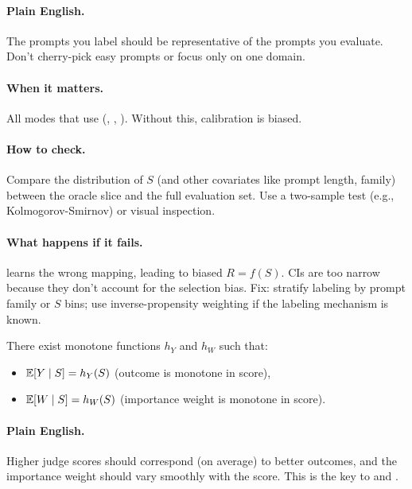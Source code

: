 \paragraph{Plain English.} The prompts you label should be representative of the prompts you evaluate. Don't cherry-pick easy prompts or focus only on one domain.

\paragraph{When it matters.} All modes that use \autocal{} (\dm, \ips, \dr). Without this, calibration is biased.

\paragraph{How to check.} Compare the distribution of $S$ (and other covariates like prompt length, family) between the oracle slice and the full evaluation set. Use a two-sample test (e.g., Kolmogorov-Smirnov) or visual inspection.

\paragraph{What happens if it fails.} \autocal{} learns the wrong mapping, leading to biased $R = f(S)$. CIs are too narrow because they don't account for the selection bias. Fix: stratify labeling by prompt family or $S$ bins; use inverse-propensity weighting if the labeling mechanism is known.

\begin{assumption}
\label{assum:j2m}
There exist monotone functions $h_Y$ and $h_W$ such that:
\begin{itemize}
\item $\operatorname{\mathbb{E}}[Y \mid S] = h_Y(S)$ (outcome is monotone in score),
\item $\operatorname{\mathbb{E}}[W \mid S] = h_W(S)$ (importance weight is monotone in score).
\end{itemize}
\end{assumption}

\paragraph{Plain English.} Higher judge scores should correspond (on average) to better outcomes, and the importance weight should vary smoothly with the score. This is the key to \autocal{} and \simcal.

